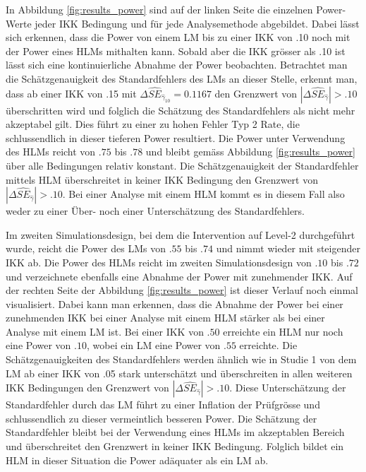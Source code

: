 \documentclass[12pt, a4paper]{article}\usepackage[]{graphicx}\usepackage[]{color}
\begin{document}
In Abbildung \ref{fig:results_power} sind auf der linken Seite die einzelnen Power-Werte jeder IKK Bedingung und für jede Analysemethode abgebildet. Dabei lässt sich erkennen, dass die Power von einem LM bis zu einer IKK von .10 noch mit der Power eines HLMs mithalten kann. Sobald aber die IKK grösser als .10 ist lässt sich eine kontinuierliche Abnahme der Power beobachten. Betrachtet man die Schätzgenauigkeit des Standardfehlers des LMs an dieser Stelle, erkennt man, dass ab einer IKK von .15 mit $\Delta\widehat{SE}_{\widehat{\gamma}_{10}} = 0.1167$ den Grenzwert von $|\Delta\widehat{SE}_{\widehat{\gamma}}| > .10$ \citep{hooglandboosma1998robustness} überschritten wird und folglich die Schätzung des Standardfehlers als nicht mehr akzeptabel gilt. Dies führt zu einer zu hohen Fehler Typ 2 Rate, die schlussendlich  in dieser tieferen Power resultiert. Die Power unter Verwendung des HLMs reicht von $.75$ bis $.78$ und bleibt gemäss Abbildung \ref{fig:results_power} über alle Bedingungen relativ konstant. Die Schätzgenauigkeit der Standardfehler mittels HLM überschreitet in keiner IKK Bedingung den Grenzwert von $|\Delta\widehat{SE}_{\widehat{\gamma}}| > .10$. Bei einer Analyse mit einem HLM kommt es in diesem Fall also weder zu einer Über- noch einer Unterschätzung des Standardfehlers.

Im zweiten Simulationsdesign, bei dem die Intervention auf Level-2 durchgeführt wurde, reicht die Power des LMs von $.55$ bis $.74$ und nimmt wieder mit steigender IKK ab. Die Power des HLMs reicht im zweiten Simulationsdesign von $.10$ bis $.72$ und verzeichnete ebenfalls eine Abnahme der Power mit zunehmender IKK. Auf der rechten Seite der Abbildung \ref{fig:results_power} ist dieser Verlauf noch einmal visualisiert. Dabei kann man erkennen, dass die Abnahme der Power bei einer zunehmenden IKK bei einer Analyse mit einem HLM stärker als bei einer Analyse mit einem LM ist. Bei einer IKK von $.50$ erreichte ein HLM nur noch eine Power von $.10$, wobei ein LM eine Power von $.55$ erreichte. Die Schätzgenauigkeiten des Standardfehlers werden ähnlich wie in Studie 1 von dem LM ab einer IKK von .05 stark unterschätzt und überschreiten in allen weiteren IKK Bedingungen den Grenzwert von $|\Delta\widehat{SE}_{\widehat{\gamma}}| > .10$. Diese Unterschätzung der Standardfehler durch das LM führt zu einer Inflation der Prüfgrösse und schlussendlich zu dieser vermeintlich besseren Power. Die Schätzung der Standardfehler bleibt bei der Verwendung eines HLMs im akzeptablen Bereich und überschreitet den Grenzwert in keiner IKK Bedingung. Folglich bildet ein HLM in dieser Situation die Power adäquater als ein LM ab.
\end{document}
